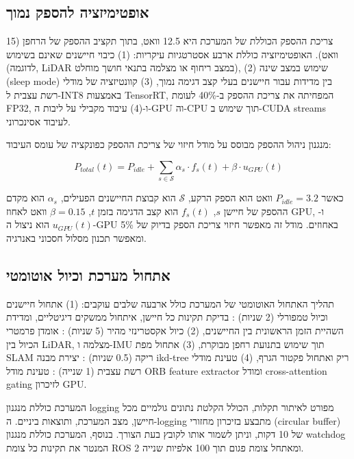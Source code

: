 \subsection{אופטימיזציה להספק נמוך}
\label{sec:ch07_power_optimization}

צריכת ההספק הכוללת של המערכת היא 12.5 וואט, בתוך תקציב ההספק של הרחפן (15 וואט). האופטימיזציה כוללת ארבע אסטרטגיות עיקריות: (1) כיבוי חיישנים שאינם בשימוש (לדוגמה, LiDAR במצב ריחוף או מצלמה בתנאי חושך מוחלט), (2) שימוש במצב שינה (sleep mode) בין מדידות עבור חיישנים בעלי קצב דגימה נמוך, (3) קוונטיזציה של מודלי רשת עצבית ל-INT8 באמצעות TensorRT, המפחיתה את צריכת ההספק ב-40\% לעומת FP32, ו-(4) עיבוד מקבילי על ליבות ה-GPU וה-CPU תוך שימוש ב-CUDA streams לעיבוד אסינכרוני.

מנגנון ניהול ההספק מבוסס על מודל חיזוי של צריכת ההספק כפונקציה של עומס העיבוד:

\begin{equation}
P_{total}(t) = P_{idle} + \sum_{s \in \mathcal{S}} \alpha_s \cdot f_s(t) + \beta \cdot u_{GPU}(t)
\label{eq:ch07_power_model}
\end{equation}

כאשר $P_{idle} = 3.2$ וואט הוא הספק הרקע, $\mathcal{S}$ הוא קבוצת החיישנים הפעילים, $\alpha_s$ הוא מקדם ההספק של חיישן $s$, $f_s(t)$ הוא קצב הדגימה בזמן $t$, $\beta = 0.15$ וואט לאחוז GPU, ו-$u_{GPU}(t)$ הוא ניצול ה-GPU באחוזים. מודל זה מאפשר חיזוי צריכת הספק בדיוק של 5\% ומאפשר תכנון מסלול חסכוני באנרגיה.

\subsection{אתחול מערכת וכיול אוטומטי}
\label{sec:ch07_system_initialization}

תהליך האתחול האוטומטי של המערכת כולל ארבעה שלבים עוקבים: (1) אתחול חיישנים וכיול טמפורלי (2 שניות) : בדיקת תקינות כל חיישן, איתחול ממשקים דיגיטליים, ומדידת השהיית הזמן הראשונית בין החיישנים, (2) כיול אקסטרינזי מהיר (5 שניות) : אומדן פרמטרי הכיול בין LiDAR, מצלמה ו-IMU תוך שימוש בתנועת רחפן מבוקרת, (3) אתחול מפת SLAM ריקה (0.5 שניות) : יצירת מבנה ikd-tree ריק ואתחול פקטור הגרף, (4) טעינת מודלי רשת עצבית (1 שנייה) : טעינת מודל ORB feature extractor ומודל cross-attention gating לזיכרון GPU.

המערכת כוללת מנגנון logging מפורט לאיתור תקלות, הכולל הקלטת נתונים גולמיים מכל חיישן, מצב המערכת, ותוצאות ביניים. ה-logging מתבצע בזיכרון מחזורי (circular buffer) של 10 דקות, וניתן לשמור אותו לקובץ בעת הצורך. בנוסף, המערכת כוללת מנגנון watchdog המנטר את תקינות כל צומת ROS 2 ומאתחל צומת פגום תוך 100 אלפיות שנייה.

